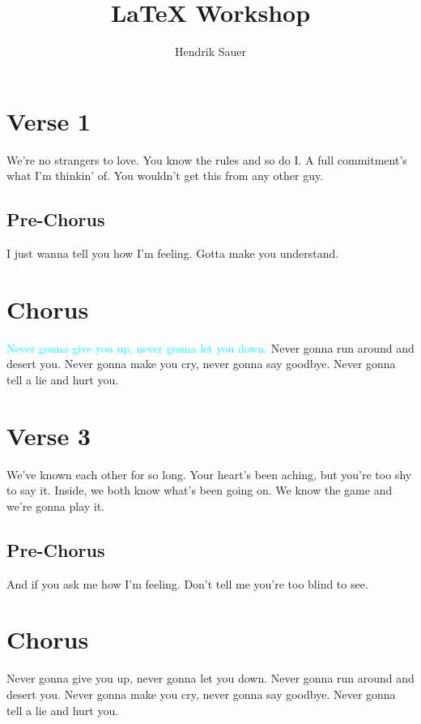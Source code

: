 \documentclass{article}
\title{\LaTeX{} Workshop}
\author{Hendrik Sauer}
\begin{document}
\maketitle

\section{Verse 1}

We're no strangers to love.
You know the rules and so do I.
A full commitment's what I'm thinkin' of.
You wouldn't get this from any other guy.

\subsection{Pre-Chorus}

I just wanna tell you how I'm feeling.
Gotta make you understand.

\section{Chorus}

\textcolor{cyan}{Never gonna give you up, never gonna let you down.}
Never gonna run around and desert you.
Never gonna make you cry, never gonna say goodbye.
Never gonna tell a lie and hurt you.

\section{Verse 3}

We've known each other for so long.
Your heart's been aching, but you're too shy to say it.
Inside, we both know what's been going on.
We know the game and we're gonna play it.

\subsection{Pre-Chorus}

And if you ask me how I'm feeling.
Don't tell me you're too blind to see.

\section{Chorus}

Never gonna give you up, never gonna let you down.
Never gonna run around and desert you.
Never gonna make you cry, never gonna say goodbye.
Never gonna tell a lie and hurt you.
\end{document}
